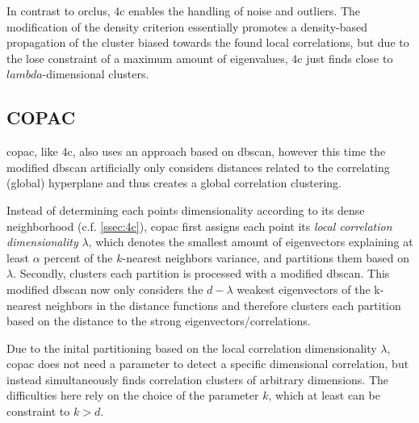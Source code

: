 In contrast to \gls{orclus}, \gls{4c} enables the handling of noise and outliers. The modification of the density criterion essentially promotes a density-based propagation of the cluster biased towards the found local correlations, but due to the lose constraint of a maximum amount of eigenvalues, \gls{4c} just finds close to $lambda$-dimensional clusters.

\subsection{COPAC}
\gls{copac}, like \gls{4c}, also uses an approach based on \acrshort{dbscan}, however this time the modified \acrshort{dbscan} artificially only considers distances related to the correlating (global) hyperplane and thus creates a global correlation clustering. 

Instead of determining each points dimensionality according to its dense neighborhood (c.f. \autoref{ssec:4c}), \gls{copac} first assigns each point its \textit{local correlation dimensionality} $\lambda$, which denotes the smallest amount of eigenvectors explaining at least $\alpha$ percent of the $k$-nearest neighbors variance, and partitions them based on $\lambda$. Secondly, clusters each partition is processed with a modified \acrshort{dbscan}. This modified \acrshort{dbscan} now only considers the $d-\lambda$ weakest eigenvectors of the k-nearest neighbors in the distance functions and therefore clusters each partition based on the distance to the strong eigenvectors/correlations.

Due to the inital partitioning based on the local correlation dimensionality $\lambda$, \gls{copac} does not need a parameter to detect a specific dimensional correlation, but instead simultaneously finds correlation clusters of arbitrary dimensions. The difficulties here rely on the choice of the parameter $k$, which at least can be constraint to $k>d$.
\\



